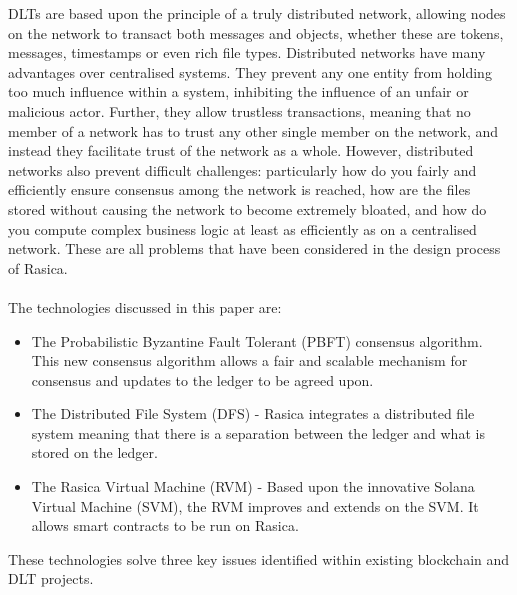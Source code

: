 DLTs are based upon the principle of a truly distributed network, allowing nodes on the network to transact both messages and objects, whether these are tokens, messages, timestamps or even rich file types. Distributed networks have many advantages over centralised systems. They prevent any one entity from holding too much influence within a system, inhibiting the influence of an unfair or malicious actor. Further, they allow trustless transactions, meaning that no member of a network has to trust any other single member on the network, and instead they facilitate trust of the network as a whole. However, distributed networks also prevent difficult challenges: particularly how do you fairly and efficiently ensure consensus among the network is reached, how are the files stored without causing the network to become extremely bloated, and how do you compute complex business logic at least as efficiently as on a centralised network. These are all problems that have been considered in the design process of Rasica. \\ \\

The technologies discussed in this paper are:

\begin{itemize}
\item The Probabilistic Byzantine Fault Tolerant (PBFT) consensus algorithm. This new consensus algorithm allows a fair and scalable mechanism for consensus and updates to the ledger to be agreed upon.
\item The Distributed File System (DFS) - Rasica integrates a distributed file system meaning that there is a separation between the ledger and what is stored on the ledger.
\item The Rasica Virtual Machine (RVM) - Based upon the innovative Solana Virtual Machine (SVM), the RVM improves and extends on the SVM. It allows smart contracts to be run on Rasica. \\
\end{itemize}

These technologies solve three key issues identified within existing blockchain and DLT projects. \\

